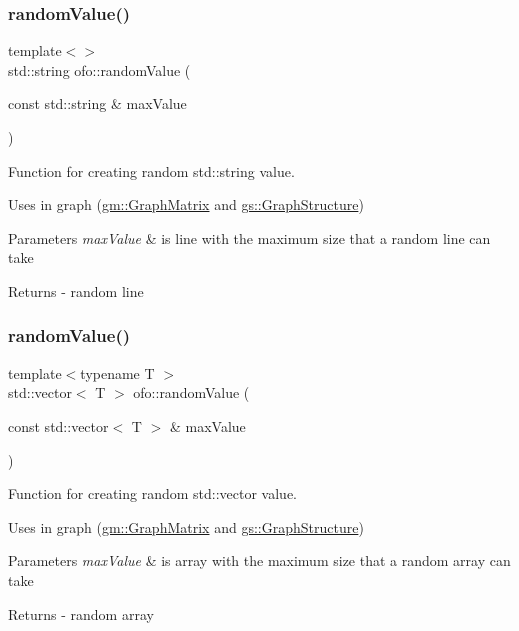 \subsubsection{\texorpdfstring{random\+Value()}{randomValue()}\hspace{0.1cm}{\footnotesize\ttfamily [3/4]}}
{\footnotesize\ttfamily template$<$$>$ \\
std\+::string ofo\+::random\+Value (\begin{DoxyParamCaption}\item[{const std\+::string \&}]{max\+Value }\end{DoxyParamCaption})}



Function for creating random std\+::string value. 

Uses in graph (\mbox{\hyperlink{classgm_1_1_graph_matrix}{gm\+::\+Graph\+Matrix}} and \mbox{\hyperlink{classgs_1_1_graph_structure}{gs\+::\+Graph\+Structure}}) 
\begin{DoxyParams}{Parameters}
{\em max\+Value} & is line with the maximum size that a random line can take \\
\hline
\end{DoxyParams}
\begin{DoxyReturn}{Returns}
-\/ random line 
\end{DoxyReturn}
\mbox{\label{namespaceofo_aeded67ad2a0018cf9fb55c1697c4ae87}} 
\subsubsection{\texorpdfstring{random\+Value()}{randomValue()}\hspace{0.1cm}{\footnotesize\ttfamily [4/4]}}
{\footnotesize\ttfamily template$<$typename T $>$ \\
std\+::vector$<$ T $>$ ofo\+::random\+Value (\begin{DoxyParamCaption}\item[{const std\+::vector$<$ T $>$ \&}]{max\+Value }\end{DoxyParamCaption})}



Function for creating random std\+::vector value. 

Uses in graph (\mbox{\hyperlink{classgm_1_1_graph_matrix}{gm\+::\+Graph\+Matrix}} and \mbox{\hyperlink{classgs_1_1_graph_structure}{gs\+::\+Graph\+Structure}}) 
\begin{DoxyParams}{Parameters}
{\em max\+Value} & is array with the maximum size that a random array can take \\
\hline
\end{DoxyParams}
\begin{DoxyReturn}{Returns}
-\/ random array 
\end{DoxyReturn}
\mbox{\label{namespaceofo_a69e3fd282eb0698e75471037b3bf5c14}} 
